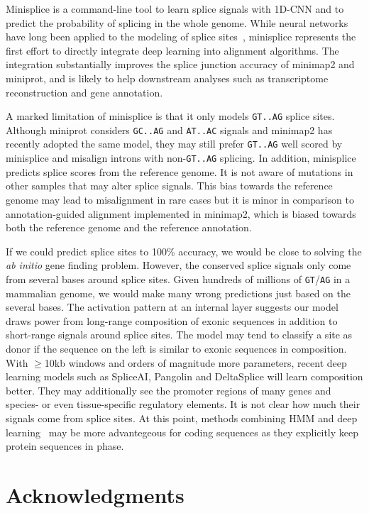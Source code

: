 \documentclass[webpdf,contemporary,large,namedate]{oup-authoring-template}%
\begin{document}
Minisplice is a command-line tool to learn splice signals with 1D-CNN
and to predict the probability of splicing in the whole genome.
While neural networks have long been applied to the modeling of splice sites~\citep{Reese:1997aa},
minisplice represents the first effort to directly integrate deep learning into alignment algorithms.
The integration substantially improves the splice junction accuracy of minimap2 and miniprot,
and is likely to help downstream analyses such as transcriptome reconstruction and gene annotation.

A marked limitation of minisplice is that it only models {\tt GT..AG} splice sites.
Although miniprot considers {\tt GC..AG} and {\tt AT..AC} signals and minimap2 has recently adopted the same model,
they may still prefer {\tt GT..AG} well scored by minisplice and misalign introns with non-{\tt GT..AG} splicing.
In addition, minisplice predicts splice scores from the reference genome.
It is not aware of mutations in other samples that may alter splice signals.
This bias towards the reference genome may lead to misalignment in rare cases
but it is minor in comparison to annotation-guided alignment implemented in minimap2,
which is biased towards both the reference genome and the reference annotation.

If we could predict splice sites to 100\% accuracy, we would be close to solving the \emph{ab initio} gene finding problem.
However, the conserved splice signals only come from several bases around splice sites.
Given hundreds of millions of {\tt GT}/{\tt AG} in a mammalian genome, we would make many wrong predictions just based on the several bases.
The activation pattern at an internal layer suggests our model
draws power from long-range composition of exonic sequences in addition to short-range signals around splice sites.
The model may tend to classify a site as donor if the sequence on the left is similar to exonic sequences in composition.
With $\ge$10kb windows and orders of magnitude more parameters, recent deep learning models
such as SpliceAI, Pangolin and DeltaSplice will learn composition better.
They may additionally see the promoter regions of many genes and species- or even tissue-specific regulatory elements.
It is not clear how much their signals come from splice sites.
At this point, methods combining HMM and deep learning~\citep{Gabriel:2024aa,Holst2023.02.06.527280}
may be more advantegeous for coding sequences as they explicitly keep protein sequences in phase.

\section*{Acknowledgments}
\end{document}
